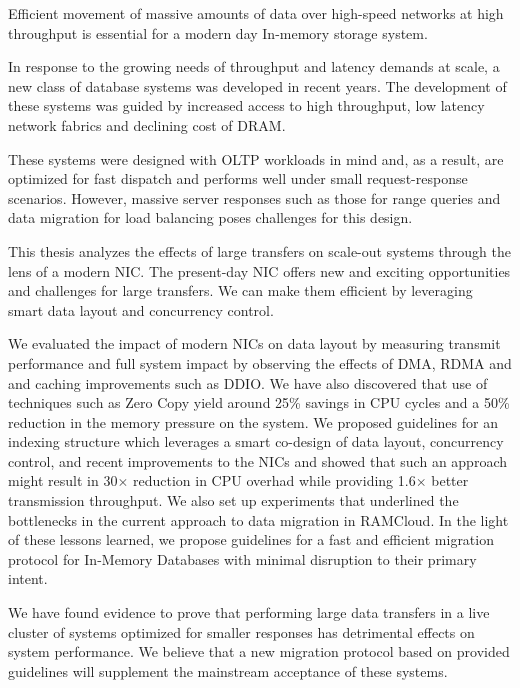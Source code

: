 


Efficient movement of massive amounts of data over high-speed networks at high 
throughput is essential for a modern day In-memory storage system.

In response to the growing needs of throughput and latency demands at scale, a new class of database systems was developed in recent years.
The development of these systems was guided by increased access to high throughput, low latency network fabrics and declining cost of DRAM.

These systems were designed with OLTP workloads in mind and, as a result, are optimized for fast dispatch and performs well under small
request-response scenarios. However, massive server responses such as those for range queries and data migration for load balancing poses challenges for this design.  

This thesis analyzes the effects of large transfers on scale-out systems through the lens of a modern NIC.
The present-day NIC offers new and exciting opportunities and challenges for large transfers.
We can make them efficient by leveraging smart data layout and concurrency control.

We evaluated the impact of modern NICs on data layout by measuring transmit performance and full system impact by observing the effects of DMA, RDMA and and caching improvements such as DDIO. 
We have also discovered that use of techniques such as Zero Copy yield around 25\% savings in CPU cycles and a 50\% reduction in the memory pressure on the system. 
We proposed guidelines for an indexing structure which leverages a smart co-design of data layout, concurrency control, and recent improvements to the NICs and showed that such an approach 
might result in 30$\times$ reduction in CPU overhad while providing 1.6$\times$ better transmission throughput. 
We also set up experiments that underlined the bottlenecks in the current approach to data migration in RAMCloud.
In the light of these lessons learned, we propose guidelines for a fast and efficient migration protocol for In-Memory Databases with minimal disruption to their primary intent.

We have found evidence to prove that performing large data transfers in a live cluster of systems optimized for smaller responses has detrimental effects on system performance. 
We believe that a new migration protocol based on provided guidelines will supplement the mainstream acceptance of these systems.